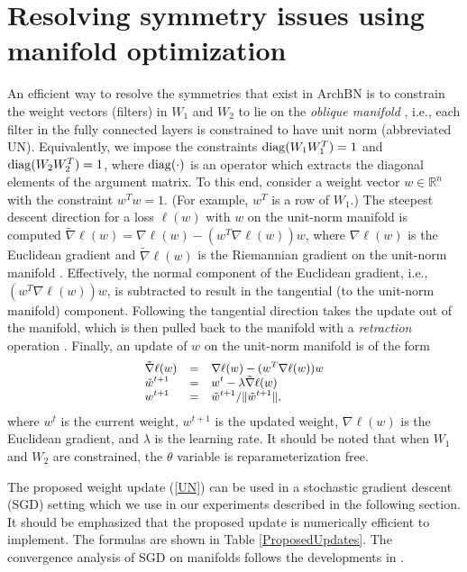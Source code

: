 \documentclass{article} %
\newcommand{\changeBM}[1]{#1} %
\newcommand{\changeVB}[1]{#1} %
\newcommand{\diag}{{\rm diag}}
\begin{document}
\section{Resolving symmetry issues using manifold optimization}
\label{Optimization}
An efficient way to \changeBM{resolve} the symmetries that exist in ArchBN is to constrain the weight vectors (filters) in $W_{1}$ and $W_{2}$ to lie on the \emph{oblique manifold} \cite{absil08a, ManOpt}, i.e., each filter in the fully connected layers is constrained to have \changeBM{unit} norm (abbreviated UN). \changeVB{Equivalently, we impose the constraints $\diag (W_1 W_1^T) = 1$ and $\diag (W_2 W_2^T) = 1$, where $\diag(\cdot)$ is an operator which extracts the diagonal elements of the argument matrix.} To this end, consider a weight vector $w \in \mathbb{R}^{n}$ with the constraint $w^Tw = 1$. (For example, $w^T$ is a row of $W_1$.) The steepest descent direction for a loss $\ell(w)$ \changeBM{with $w$ on the unit-norm manifold} is computed $\tilde{\nabla} \ell(w) = \nabla \ell(w) - (w^{T}\nabla \ell(w)) w$, \changeBM{where $\nabla \ell(w)$ is the Euclidean gradient and $\tilde{\nabla} \ell(w)$ is the Riemannian gradient on the unit-norm manifold \cite[Chapter~3]{absil08a}.} Effectively, the normal component of the Euclidean gradient, i.e., $(w^{T}\nabla \ell(w)) w$, is subtracted to result in the tangential (to the unit-norm manifold) component. \changeBM{Following the tangential direction takes the update out of the manifold, which is then pulled back to the manifold with a \emph{retraction} operation \cite[Example~4.1.1]{absil08a}.} \changeBM{Finally}, an update of $w$ on the unit-norm manifold is of the form
\begin{equation}\label{UN}
\small{
\begin{array}{lll}
\tilde{\nabla} \ell(w) &= & \nabla \ell(w) - (w^{T}\nabla \ell(w)) w \\
\tilde{w}^{t+1}& = & w^{t} - \lambda \tilde{\nabla} \ell(w) \\ 
w^{t+1} &= & \tilde{w}^{t+1} / \| \tilde{w}^{t+1} \|, 
\end{array}
}
\end{equation}
where $w^t$ is the current weight, $w^{t+1}$ is the updated weight, $\nabla \ell(w)$ is the Euclidean gradient, and $\lambda$ is the learning rate. \changeBM{It should be noted that when $W_1$ and $W_2$ are constrained, the $\theta$ variable is reparameterization free.}

\changeVB{The proposed weight update (\ref{UN}) can be used in a stochastic gradient descent (SGD) setting which we use in our experiments described in the following section. \changeBM{It should be emphasized that the proposed update is numerically efficient to implement. The formulas are shown in Table \ref{ProposedUpdates}. The convergence analysis of SGD on manifolds follows the developments in \cite{Bottou, bonnabel13a}.}}
\end{document}
